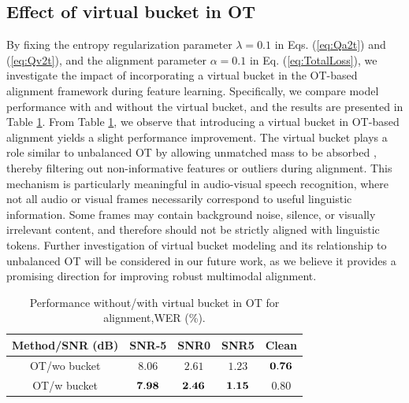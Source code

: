 \documentclass[conference]{IEEEtran}
\begin{document}
\subsection{Effect of virtual bucket in OT}
By fixing the entropy regularization parameter $\lambda=0.1$ in Eqs. (\ref{eq:Qa2t}) and (\ref{eq:Qv2t}), and the alignment parameter $\alpha=0.1$ in Eq. (\ref{eq:TotalLoss}), we investigate the impact of incorporating a virtual bucket in the OT-based alignment framework during feature learning. Specifically, we compare model performance with and without the virtual bucket, and the results are presented in Table \ref{tab:tab3}. From Table \ref{tab:tab3}, we observe that introducing a virtual bucket in OT-based alignment yields a slight performance improvement. The virtual bucket plays a role similar to unbalanced OT by allowing unmatched mass to be absorbed \cite{PeyreBook2019}, thereby filtering out non-informative features or outliers during alignment. This mechanism is particularly meaningful in audio-visual speech recognition, where not all audio or visual frames necessarily correspond to useful linguistic information. Some frames may contain background noise, silence, or visually irrelevant content, and therefore should not be strictly aligned with linguistic tokens. Further investigation of virtual bucket modeling and its relationship to unbalanced OT will be considered in our future work, as we believe it provides a promising direction for improving robust multimodal alignment.
\begin{table}[tbh]
	\centering
	\caption{Performance without/with virtual bucket in OT for alignment,WER (\%).}
	\begin{tabular}{|c||c||c||c||c|}
		\hline
		Method/SNR (dB) &SNR-5 & SNR0 & SNR5 & Clean \\		
		\hline	
		\hline
		OT/wo bucket  &$ {8.06}$ &$ {2.61}$ & ${1.23}$ &  ${\bf 0.76}$	\\
		\hline	
		OT/w bucket  & ${\bf 7.98}$ & ${\bf 2.46}$ & ${\bf 1.15}$ &  $0.80$ \\ 					
		\hline								
	\end{tabular}
	\label{tab:tab3}
\end{table}
\end{document}
